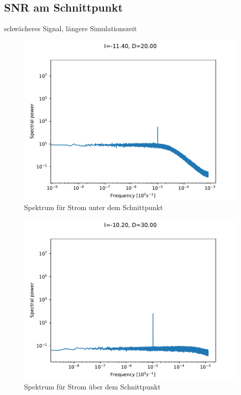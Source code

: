 \documentclass[12pt,a4paper]{article}
\begin{document}
\subsection{SNR am Schnittpunkt}
schwächeres Signal, längere Simulationszeit
\begin{figure}[H]
	\centering
	\includegraphics[scale=1]{inapikrealrD20I-114.pdf}\caption{Spektrum für Strom unter dem Schnittpunkt}
	\label{rinzelsnrpois}
\end{figure}
\begin{figure}[H]
	\centering
	\includegraphics[scale=1]{inapikrealrD30I-102.pdf}\caption{Spektrum für Strom über dem Schnittpunkt}
	\label{rinzelsnrpoil}
\end{figure}
\end{document}

